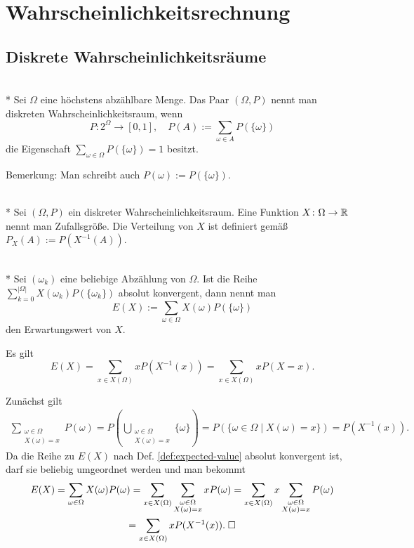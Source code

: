 
\chapter{Wahrscheinlichkeitsrechnung}

\section{Diskrete Wahrscheinlichkeitsräume}

\begin{Definition}\mbox{}\\*
Sei $\Omega$ eine höchstens abzählbare Menge. Das
Paar $(\Omega,P)$ nennt man diskreten Wahrscheinlichkeitsraum,
wenn
\[P\colon 2^\Omega\to [0,1],\quad P(A):=\sum_{\omega\in A} P(\{\omega\})\]
die Eigenschaft $\sum_{\omega\in\Omega} P(\{\omega\}) = 1$ besitzt.
\end{Definition}
Bemerkung: Man schreibt auch $P(\omega):=P(\{\omega\})$.

\begin{Definition}\mbox{}\\*
Sei $(\Omega,P)$ ein diskreter Wahrscheinlichkeitsraum.
Eine Funktion $X\colon\Omega\to\mathbb R$ nennt man Zufallsgröße.
Die Verteilung von $X$ ist definiert gemäß $P_X(A):=P(X^{-1}(A))$.
\end{Definition}

\begin{Definition}[Erwartungswert]%
\label{def:expected-value}\mbox{}\\*
Sei $(\omega_k)$ eine beliebige Abzählung von $\Omega$.
Ist die Reihe $\sum_{k=0}^{|\Omega|} X(\omega_k)P(\{\omega_k\})$
absolut konvergent, dann nennt man
\[E(X) := \sum_{\omega\in\Omega} X(\omega)P(\{\omega\})\]
den Erwartungswert von $X$.
\end{Definition}

\begin{Satz} Es gilt
\[E(X) = \sum_{x\in X(\Omega)} xP(X^{-1}(x))
= \sum_{x\in X(\Omega)} xP(X=x).\]
\end{Satz}
 Zunächst gilt
\begin{gather*}
\sum_{\substack{\omega\in\Omega\\ X(\omega)=x}}P(\omega)
= P(\bigcup_{\substack{\omega\in\Omega\\ X(\omega)=x}} \{\omega\})
= P(\{\omega\in\Omega\mid X(\omega)=x\})
= P(X^{-1}(x)).
\end{gather*}
Da die Reihe zu $E(X)$ nach Def. \ref{def:expected-value}
absolut konvergent ist, darf sie beliebig umgeordnet werden und
man bekommt
\begin{gather*}
E(X) = \sum_{\omega\in\Omega}X(\omega)P(\omega)
= \sum_{x\in X(\Omega)}\sum_{\substack{\omega\in\Omega\\ X(\omega)=x}} xP(\omega)
= \sum_{x\in X(\Omega)} x\sum_{\substack{\omega\in\Omega\\ X(\omega)=x}}P(\omega)\\
= \sum_{x\in X(\Omega)} xP(X^{-1}(x)).\;\square
\end{gather*}

